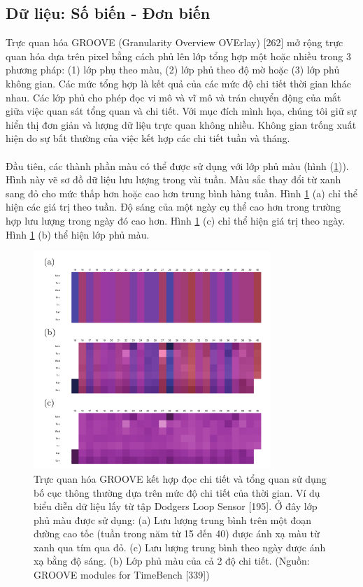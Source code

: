 \subsection{Dữ liệu: Số biến - Đơn biến}
Trực quan hóa GROOVE (Granularity Overview OVErlay) [262] mở rộng trực quan hóa dựa trên pixel bằng cách phủ lên lớp tổng hợp một hoặc nhiều trong 3 phương pháp: (1) lớp phụ theo màu, (2) lớp phủ theo độ mờ hoặc (3) lớp phủ không gian. Các mức tổng hợp là kết quả của các mức độ chi tiết thời gian khác nhau. Các lớp phủ cho phép đọc vi mô và vĩ mô và trán chuyển động của mắt giữa việc quan sát tổng quan và chi tiết. Với mục đích mình họa, chúng tôi giữ sự hiển thị đơn giản và lượng dữ liệu trực quan không nhiều. Không gian trống xuất hiện do sự bất thường của việc kết hợp các chi tiết tuần và tháng. 
\\ \\
Đầu tiên, các thành phần màu có thể được sử dụng với lớp phủ màu (hình (\ref{fig:f7.5})). Hình này vẽ sơ đồ dữ liệu lưu lượng trong vài tuần. Màu sắc thay đổi từ xanh sang đỏ cho mức thấp hơn hoặc cao hơn trung bình hàng tuần. Hình \ref{fig:f7.5} (a) chỉ thể hiện các giá trị theo tuần. Độ sáng của một ngày cụ thể cao hơn trong trường hợp lưu lượng trong ngày đó cao hơn. Hình \ref{fig:f7.5} (c) chỉ thể hiện giá trị theo ngày. Hình \ref{fig:f7.5} (b) thể hiện lớp phủ màu.
\begin{figure}[H] %
    \centering %
    \includegraphics[width=0.8\textwidth]{assets/fig_7_5.png} 
    \caption{Trực quan hóa GROOVE kết hợp đọc chi tiết và tổng quan sử dụng bố cục thông thường dựa trên mức độ chi tiết của thời gian. Ví dụ biểu diễn dữ liệu lấy từ tập Dodgers Loop Sensor [195]. Ở đây lớp phủ màu được sử dụng: (a) Lưu lượng trung bình trên một đoạn đường cao tốc (tuần trong năm từ 15 đến 40) được ánh xạ màu từ xanh qua tím qua đỏ. (c) Lưu lượng trung bình theo ngày được ánh xạ bằng độ sáng. (b) Lớp phủ màu của cả 2 độ chi tiết. (Nguồn: GROOVE modules for TimeBench [339])} %
    \label{fig:f7.5}
\end{figure}

